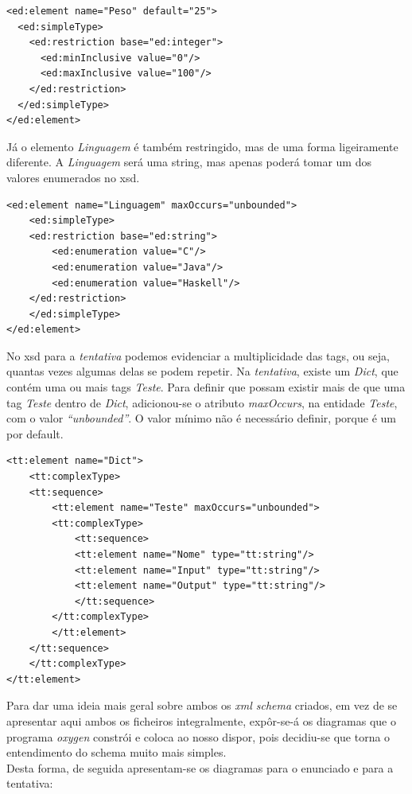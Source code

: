 \begin{lstlisting}
<ed:element name="Peso" default="25">
  <ed:simpleType>
    <ed:restriction base="ed:integer">
      <ed:minInclusive value="0"/>
      <ed:maxInclusive value="100"/>
    </ed:restriction>
  </ed:simpleType>
</ed:element>
\end{lstlisting}
Já o elemento \textit{Linguagem} é também restringido, mas de uma forma ligeiramente diferente. A \textit{Linguagem} será uma string, mas
apenas poderá tomar um dos valores enumerados no xsd.\\

\begin{lstlisting}
<ed:element name="Linguagem" maxOccurs="unbounded">
    <ed:simpleType>
	<ed:restriction base="ed:string">
	    <ed:enumeration value="C"/>
	    <ed:enumeration value="Java"/>
	    <ed:enumeration value="Haskell"/>
	</ed:restriction>
    </ed:simpleType>
</ed:element>
\end{lstlisting}


No xsd para a \textit{tentativa} podemos evidenciar a multiplicidade das tags, ou seja, quantas vezes algumas delas se podem repetir.
Na \textit{tentativa}, existe um \textit{Dict}, que contém uma ou mais tags \textit{Teste}.
Para definir que possam existir mais de que uma tag \textit{Teste} dentro de \textit{Dict}, adicionou-se o atributo \textit{maxOccurs},
na entidade \textit{Teste}, com o valor \textit{``unbounded''}. O valor mínimo não é necessário definir, porque é um por default.
\begin{lstlisting}
<tt:element name="Dict">
    <tt:complexType>
	<tt:sequence>
	    <tt:element name="Teste" maxOccurs="unbounded">
		<tt:complexType>
		    <tt:sequence>
			<tt:element name="Nome" type="tt:string"/>
			<tt:element name="Input" type="tt:string"/>
			<tt:element name="Output" type="tt:string"/>
		    </tt:sequence>
		</tt:complexType>
	    </tt:element>
	</tt:sequence>
    </tt:complexType>
</tt:element>
\end{lstlisting}

Para dar uma ideia mais geral sobre ambos os \textit{xml schema} criados, em vez de se apresentar aqui ambos os ficheiros integralmente,
 expôr-se-á os diagramas que o programa \textit{oxygen} constrói e coloca ao nosso dispor, pois decidiu-se que torna o entendimento do
schema muito mais simples.\\
\newpage
Desta forma, de seguida apresentam-se os diagramas para o enunciado e para a tentativa:\\
 
